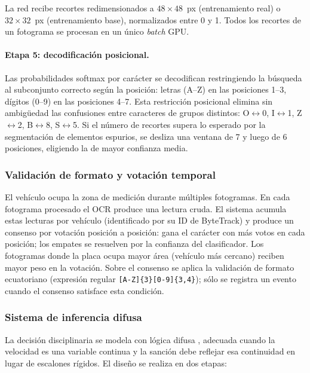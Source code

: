 \documentclass[11pt]{article}
\begin{document}
La red recibe recortes redimensionados a $48\times48$~px (entrenamiento real) o
$32\times32$~px (entrenamiento base), normalizados entre 0 y 1. Todos los recortes de
un fotograma se procesan en un único \emph{batch} GPU.

\paragraph{Etapa 5: decodificación posicional.}
Las probabilidades softmax por carácter se decodifican restringiendo la búsqueda al
subconjunto correcto según la posición: letras (A--Z) en las posiciones 1--3, dígitos
(0--9) en las posiciones 4--7. Esta restricción posicional elimina sin ambigüedad las
confusiones entre caracteres de grupos distintos: O$\leftrightarrow$0,
I$\leftrightarrow$1, Z$\leftrightarrow$2, B$\leftrightarrow$8, S$\leftrightarrow$5. Si
el número de recortes supera lo esperado por la segmentación de elementos espurios, se
desliza una ventana de 7 y luego de 6 posiciones, eligiendo la de mayor confianza media.

\subsubsection{Validación de formato y votación temporal}
\label{sec:voto}

El vehículo ocupa la zona de medición durante múltiples fotogramas. En cada fotograma
procesado el OCR produce una lectura cruda. El sistema acumula estas lecturas por
vehículo (identificado por su ID de ByteTrack) y produce un consenso por votación
posición a posición: gana el carácter con más votos en cada posición; los empates
se resuelven por la confianza del clasificador. Los fotogramas donde la placa ocupa
mayor área (vehículo más cercano) reciben mayor peso en la votación. Sobre el consenso
se aplica la validación de formato ecuatoriano (expresión regular
\texttt{[A-Z]\{3\}[0-9]\{3,4\}}); sólo se registra un evento cuando el consenso
satisface esta condición.

\subsubsection{Sistema de inferencia difusa}

La decisión disciplinaria se modela con lógica difusa \cite{zadeh}, adecuada cuando la
velocidad es una variable continua y la sanción debe reflejar esa continuidad en lugar
de escalones rígidos. El diseño se realiza en dos etapas:
\end{document}
